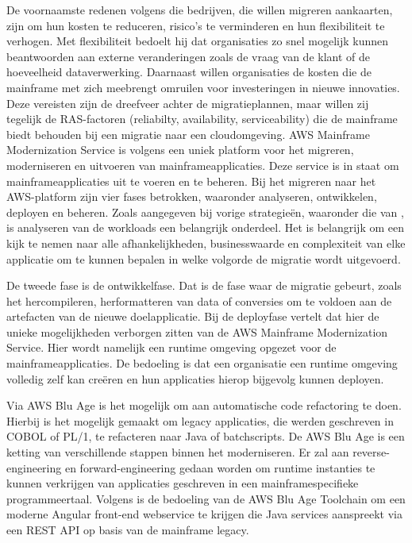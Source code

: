 De voornaamste redenen volgens \textcite{Valence2021} die bedrijven, die willen migreren aankaarten, zijn om hun kosten te reduceren, risico's te verminderen en hun flexibiliteit te verhogen. Met flexibiliteit bedoelt hij dat organisaties zo snel mogelijk kunnen beantwoorden aan externe veranderingen zoals de vraag van de klant of de hoeveelheid dataverwerking. Daarnaast willen organisaties de kosten die de mainframe met zich meebrengt omruilen voor investeringen in nieuwe innovaties. Deze vereisten zijn de dreefveer achter de migratieplannen, maar willen zij tegelijk de RAS-factoren (reliabilty, availability, serviceability) die de mainframe biedt behouden bij een migratie naar een cloudomgeving. AWS Mainframe Modernization Service is volgens \textcite{Valence2021} een uniek platform voor het migreren, moderniseren en uitvoeren van mainframeapplicaties. Deze service is in staat om mainframeapplicaties uit te voeren en te beheren. Bij het migreren naar het AWS-platform zijn vier fases betrokken, waaronder analyseren, ontwikkelen, deployen en beheren. Zoals aangegeven bij vorige strategieën, waaronder die van \textcite{Marble2017}, is analyseren van de workloads een belangrijk onderdeel. Het is belangrijk om een kijk te nemen naar alle afhankelijkheden, businesswaarde en complexiteit van elke applicatie om te kunnen bepalen in welke volgorde de migratie wordt uitgevoerd. 

De tweede fase is de ontwikkelfase. Dat is de fase waar de migratie gebeurt, zoals het hercompileren, herformatteren van data of conversies om te voldoen aan de artefacten van de nieuwe doelapplicatie. Bij de deployfase vertelt \textcite{Valence2021} dat hier de unieke mogelijkheden verborgen zitten van de AWS Mainframe Modernization Service. Hier wordt namelijk een runtime omgeving opgezet voor de mainframeapplicaties. De bedoeling is dat een organisatie een runtime omgeving volledig zelf kan creëren en hun applicaties hierop bijgevolg kunnen deployen. 

Via AWS Blu Age is het mogelijk om aan automatische code refactoring te doen. Hierbij is het mogelijk gemaakt om legacy applicaties, die werden geschreven in COBOL of PL/1, te refacteren naar Java of batchscripts. De AWS Blu Age is een ketting van verschillende stappen binnen het moderniseren. Er zal aan reverse-engineering en forward-engineering gedaan worden om runtime instanties te kunnen verkrijgen van applicaties geschreven in een mainframespecifieke programmeertaal. Volgens \textcite{Valence2021} is de bedoeling van de AWS Blu Age Toolchain om een moderne Angular front-end webservice te krijgen die Java services aanspreekt via een REST API op basis van de mainframe legacy.  

